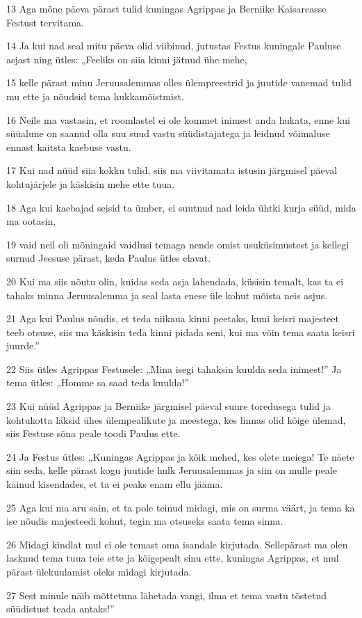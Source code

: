 \par 13 Aga mõne päeva pärast tulid kuningas Agrippas ja Berniike Kaisareasse Festust tervitama.
\par 14 Ja kui nad seal mitu päeva olid viibinud, jutustas Festus kuningale Pauluse asjast ning ütles: „Feeliks on siia kinni jätnud ühe mehe,
\par 15 kelle pärast minu Jeruusalemmas olles ülempreestrid ja juutide vanemad tulid mu ette ja nõudsid tema hukkamõistmist.
\par 16 Neile ma vastasin, et roomlastel ei ole kommet inimest anda hukata, enne kui süüalune on saanud olla suu suud vastu süüdistajatega ja leidnud võimaluse ennast kaitsta kaebuse vastu.
\par 17 Kui nad nüüd siia kokku tulid, siis ma viivitamata istusin järgmisel päeval kohtujärjele ja käskisin mehe ette tuua.
\par 18 Aga kui kaebajad seisid ta ümber, ei suutnud nad leida ühtki kurja süüd, mida ma ootasin,
\par 19 vaid neil oli mõningaid vaidlusi temaga nende omist usuküsimustest ja kellegi surnud Jeesuse pärast, keda Paulus ütles elavat.
\par 20 Kui ma siis nõutu olin, kuidas seda asja lahendada, küsisin temalt, kas ta ei tahaks minna Jeruusalemma ja seal lasta enese üle kohut mõista neis asjus.
\par 21 Aga kui Paulus nõudis, et teda niikaua kinni peetaks, kuni keisri majesteet teeb otsuse, siis ma käskisin teda kinni pidada seni, kui ma võin tema saata keisri juurde.”
\par 22 Siis ütles Agrippas Festusele: „Mina isegi tahaksin kuulda seda inimest!” Ja tema ütles: „Homme sa saad teda kuulda!”
\par 23 Kui nüüd Agrippas ja Berniike järgmisel päeval suure toredusega tulid ja kohtukotta läksid ühes ülempealikute ja meestega, kes linnas olid kõige ülemad, siis Festuse sõna peale toodi Paulus ette.
\par 24 Ja Festus ütles: „Kuningas Agrippas ja kõik mehed, kes olete meiega! Te näete siin seda, kelle pärast kogu juutide hulk Jeruusalemmas ja siin on mulle peale käinud kisendades, et ta ei peaks enam ellu jääma.
\par 25 Aga kui ma aru sain, et ta pole teinud midagi, mis on surma väärt, ja tema ka ise nõudis majesteedi kohut, tegin ma otsuseks saata tema sinna.
\par 26 Midagi kindlat mul ei ole temast oma isandale kirjutada. Sellepärast ma olen lasknud tema tuua teie ette ja kõigepealt sinu ette, kuningas Agrippas, et mul pärast ülekuulamist oleks midagi kirjutada.
\par 27 Sest minule näib mõttetuna lähetada vangi, ilma et tema vastu tõstetud süüdistust teada antaks!”

